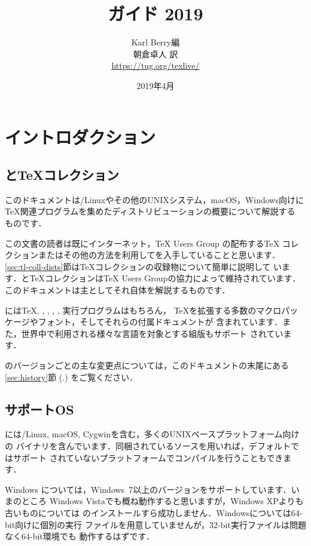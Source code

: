 \documentclass[uplatex]{jsarticle}
\title{{\huge {\TL ガイド 2019}}}
\author{%
  Karl Berry編 \\
  朝倉卓人 訳 \\[3mm]
  \url{https://tug.org/texlive/}
}
\date{2019年4月}
\begin{document}
\maketitle
\thispagestyle{empty}

\begin{multicols}{2}
\tableofcontents
\end{multicols}

\section{イントロダクション}\label{sec:intro}

\subsection{\TL と\TeX コレクション}

このドキュメントは\GNU/Linuxやその他のUNIXシステム，macOS，Windows向けに
\TeX 関連プログラムを集めたディストリビューション\TL の概要について解説する
ものです．

この文書の読者は既にインターネット，{\TeX} Users Group の配布する\TeX
コレクション\DVD またはその他の方法を利用して\TL を入手していることと思います．
\ref{sec:tl-coll-dists}節は\TeX コレクション\DVD の収録物について簡単に説明して
います．\TL と\TeX コレクションは{\TeX} Users Groupの協力によって維持されています．
このドキュメントは主として\TL それ自体を解説するものです．

\TL には\TeX, \LaTeXe, \ConTeXt, \MF, \MP, \BibTeX 実行プログラムはもちろん，
\TeX を拡張する多数のマクロパッケージやフォント，そしてそれらの付属ドキュメントが
含まれています．また，世界中で利用される様々な言語を対象とする組版もサポート
されています．

\TL のバージョンごとの主な変更点については，このドキュメントの末尾にある
\ref{sec:history}節 (\p.\pageref{sec:history}) をご覧ください．

\subsection{サポートOS}
\label{sec:os-support}

\TL には\GNU/Linux, macOS, Cygwinを含む，多くのUNIXベースプラットフォーム向けの
バイナリを含んでいます．同梱されているソースを用いれば，デフォルトではサポート
されていないプラットフォームでコンパイルを行うこともできます．

Windows については，Windows~7以上のバージョンをサポートしています．いまのところ
Windows Vistaでも概ね動作すると思いますが，Windows XPよりも古いものについては
\TL のインストールすら成功しません．Windowsについては64-bit向けに個別の実行
ファイルを用意していませんが，32-bit実行ファイルは問題なく64-bit環境でも
動作するはずです．
\end{document}
